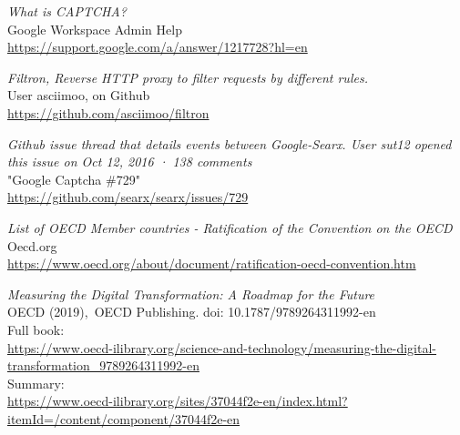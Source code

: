 \begin{thebibliography}{1}
    \emph{
        What is CAPTCHA?
    }
    \\
    \color{gray}
    Google Workspace Admin Help
    \\
    \color{black}
    \scriptsize
    \url{
    https://support.google.com/a/answer/1217728?hl=en
    }
    \normalsize

    \emph{
        Filtron,
        Reverse HTTP proxy to filter requests by different rules.
    }
    \\
    \color{gray}
    User asciimoo\color{black}, on Github
    \\
    \scriptsize
    \url{
        https://github.com/asciimoo/filtron
    }
    \normalsize

\emph{
    Github issue thread that details events between Google-Searx.
    User sut12 opened this issue on Oct 12, 2016 · 138 comments
}
\\
\color{gray}
    "Google Captcha \#729"
\\
\color{black}
\scriptsize
\url{
https://github.com/searx/searx/issues/729
}
\normalsize


\emph{
    List of OECD Member countries - Ratification of the Convention on the OECD
}
\\
\color{gray}
Oecd.org
\\
\color{black}
\scriptsize
\url{
https://www.oecd.org/about/document/ratification-oecd-convention.htm
}
\normalsize

\emph{
    Measuring the Digital Transformation: A Roadmap for the Future
}
\\
\color{gray}
OECD (2019)\color{black},\ OECD Publishing. doi: 10.1787/9789264311992-en
\\
\scriptsize
Full book:
\tiny
\\
\url{
https://www.oecd-ilibrary.org/science-and-technology/measuring-the-digital-transformation_9789264311992-en
}
\\
\scriptsize
Summary:
\tiny
\\
\url{
https://www.oecd-ilibrary.org/sites/37044f2e-en/index.html?itemId=/content/component/37044f2e-en
}
\normalsize

\end{thebibliography}
